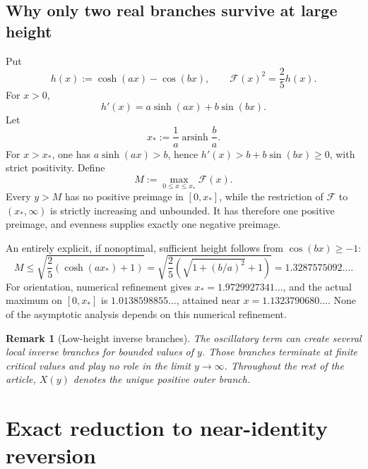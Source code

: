 \documentclass[11pt,oneside]{article}
\numberwithin{equation}{section}
\newtheorem{remark}[theorem]{Remark}
\newcommand{\arsinh}{\operatorname{arsinh}}
\newcommand{\cF}{\mathcal{F}}
\begin{document}
\subsection{Why only two real branches survive at large height}

Put
\begin{equation}
  h(x):=\cosh(ax)-\cos(bx),
  \qquad \cF(x)^2=\frac25h(x).
\end{equation}
For \(x>0\),
\begin{equation}
  h'(x)=a\sinh(ax)+b\sin(bx).
  \label{eq:h-prime}
\end{equation}
Let
\begin{equation}
  x_*:=\frac1a\arsinh\frac ba.
  \label{eq:x-star}
\end{equation}
For \(x>x_*\), one has \(a\sinh(ax)>b\), hence
\(h'(x)>b+b\sin(bx)\ge0\), with strict positivity.  Define
\begin{equation}
  M:=\max_{0\le x\le x_*}\cF(x).
  \label{eq:M-def}
\end{equation}
Every \(y>M\) has no positive preimage in \([0,x_*]\), while the restriction
of \(\cF\) to \((x_*,\infty)\) is strictly increasing and unbounded.  It has
therefore one positive preimage, and evenness supplies exactly one negative
preimage.

An entirely explicit, if nonoptimal, sufficient height follows from
\(\cos(bx)\ge-1\):
\begin{equation}
  M\le
  \sqrt{\frac25\left(\cosh(ax_*)+1\right)}
  =\sqrt{\frac25\left(\sqrt{1+(b/a)^2}+1\right)}
  =1.3287575092\ldots.
  \label{eq:M-bound}
\end{equation}
For orientation, numerical refinement gives
\(x_*=1.9729927341\ldots\), and the actual maximum on \([0,x_*]\) is
\(1.0138598855\ldots\), attained near \(x=1.1323790680\ldots\).  None of the
asymptotic analysis depends on this numerical refinement.

\begin{remark}[Low-height inverse branches]
The oscillatory term can create several local inverse branches for bounded
values of \(y\).  Those branches terminate at finite critical values and play no
role in the limit \(y\to\infty\).  Throughout the rest of the article,
\(X(y)\) denotes the unique positive outer branch.
\end{remark}

\section{Exact reduction to near-identity reversion}
\label{sec:exact-reduction}
\end{document}
